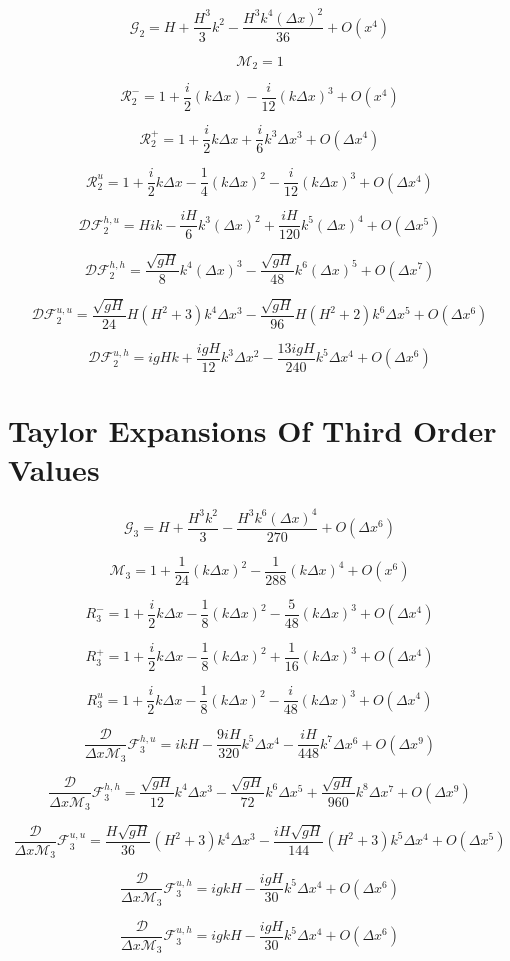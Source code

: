 \documentclass[12pt]{article}
\begin{document}
\[\mathcal{G}_2 = H +\frac{H^3}{3} k^2 -\frac{H^3 k^4(\Delta x)^2}{36} + O(x^{4})\]

\[\mathcal{M}_2 = 1\]

\[\mathcal{R}_2^- = 1  + \frac{i}{2} (k \Delta x) - \frac{i}{12}(k \Delta x)^3  +  O(x^{4})\]

\[\mathcal{R}_2^+ =1 + \frac{i}{2}k\Delta x + \frac{i}{6} k^3 \Delta x^3 + O\left(\Delta x ^4\right)\]

\[\mathcal{R}^u_2 = 1 + \frac{i}{2}k\Delta x - \frac{1}{4} (k \Delta x)^2 - \frac{i}{12} (k \Delta x)^3 +  O( \Delta x^4)\]

\[\mathcal{D}\mathcal{F}_2^{h,u} = Hik - \frac{iH}{6}k^3(\Delta x)^2 + \frac{iH}{120}k^5 (\Delta x)^4 + O(\Delta x ^5) \]

\[\mathcal{D}\mathcal{F}_2^{h,h} = \frac{\sqrt{gH}}{8} k^4(\Delta x)^3  - \frac{\sqrt{gH}}{48} k^6(\Delta x)^5 + O(\Delta x^7) \]

\[\mathcal{D}\mathcal{F}_2^{u,u} =  \frac{\sqrt{gH}}{24}H(H^2 +3)k^4 \Delta x^3 - \frac{\sqrt{gH}}{96}H(H^2 +2)k^6 \Delta x^5 + O(\Delta x ^6)\]

\[\mathcal{D}\mathcal{F}_2^{u,h} = igHk + \frac{igH}{12}  k^3 \Delta x^2 - \frac{13igH}{240}  k^5 \Delta x^4 + O(\Delta x ^6)  \]

\section{Taylor Expansions Of Third Order Values }

\[\mathcal{G}_3 = H + \frac{H^3k^2}{3} -\frac{H^3 k^6 (\Delta x)^4}{270} + O(\Delta x^{6}) \]

\[\mathcal{M}_3= 1 + \frac{1}{24} (k\Delta x)^2 - \frac{1}{288} (k\Delta x)^4 + O(x^{6})\]

\[R_3^-= 1 + \frac{i}{2}k\Delta x - \frac{1}{8} (k \Delta x)^2 - \frac{5}{48} (k \Delta x)^3 +  O( \Delta x^4) \]

\[R_3^+= 1 + \frac{i}{2}k\Delta x - \frac{1}{8} (k \Delta x)^2 + \frac{1}{16} (k \Delta x)^3 +  O( \Delta x^4)\] 

\[R^u_3 = 1 + \frac{i}{2}k\Delta x - \frac{1}{8} (k \Delta x)^2 - \frac{i}{48} (k \Delta x)^3 +  O( \Delta x^4) \]


\[\frac{\mathcal{D}}{\Delta x\mathcal{M}_3}\mathcal{F}_3^{h,u} = ikH - \frac{9iH}{320} k^5 \Delta x^4 - \frac{iH}{448 }k^7 \Delta x ^6 + O(\Delta x ^9) \]

\[\frac{\mathcal{D}}{\Delta x\mathcal{M}_3}\mathcal{F}_3^{h,h} = \frac{\sqrt{gH}}{12} k^4 \Delta x^3 - \frac{\sqrt{gH}}{72}k^6 \Delta x^5 + \frac{\sqrt{gH}}{960}k^8 \Delta x^7 + O(\Delta x ^{9})\]



\[\frac{\mathcal{D}}{\Delta x\mathcal{M}_3}\mathcal{F}_3^{u,u} = \frac{H\sqrt{gH}}{36}(H^2 + 3) k^4 \Delta x^3 - \frac{iH\sqrt{gH}}{144}(H^2 + 3) k^5 \Delta x^4  + O(\Delta x^5) \]

\[\frac{\mathcal{D}}{\Delta x\mathcal{M}_3}\mathcal{F}_3^{u,h} = igkH  - \frac{igH }{30} k^5\Delta x ^4 + O(\Delta x ^6) \]

\[\frac{\mathcal{D}}{\Delta x\mathcal{M}_3}\mathcal{F}_3^{u,h} = igkH  - \frac{igH }{30} k^5\Delta x ^4 + O(\Delta x ^6) \]
\end{document}
